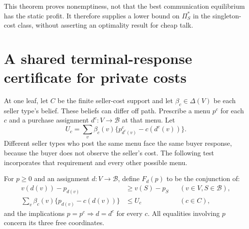 \documentclass[11pt]{article}
\theoremstyle{remark}
\begin{document}
This theorem proves nonemptiness, not that the best communication equilibrium has the static profit. It therefore supplies a lower bound on $\Pi_S^*$ in the singleton-cost class, without asserting an optimality result for cheap talk.

\section{A shared terminal-response certificate for private costs}
At one leaf, let $C$ be the finite seller-cost support and let $\beta_c\in\Delta(V)$ be each seller type's belief. These beliefs can differ off path. Prescribe a menu $p^c$ for each $c$ and a purchase assignment $d^c:V\to\mathcal B$ at that menu. Let
\[
 U_c=\sum_v\beta_c(v)\{p^c_{d^c(v)}-c(d^c(v))\}.
\]
Different seller types who post the same menu face the same buyer response, because the buyer does not observe the seller's cost. The following test incorporates that requirement and every other possible menu.

For $p\geq0$ and an assignment $d:V\to\mathcal B$, define $F_d(p)$ to be the conjunction of:
\begin{align*}
 v(d(v))-p_{d(v)}&\geq v(S)-p_S
 &&(v\in V,S\in\mathcal B),\\
 \sum_v\beta_c(v)\{p_{d(v)}-c(d(v))\}&\leq U_c
 &&(c\in C),
\end{align*}
and the implications $p=p^c\Rightarrow d=d^c$ for every $c$. All equalities involving $p$ concern its three free coordinates.
\end{document}
